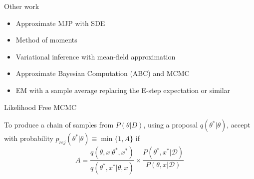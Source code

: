 \documentclass[12pt,a4paper,t,xcolor=dvipsnames,slidestop,compress,mathserif]{beamer}
\newcommand{\red}[1]{{\color{red}#1}}
\begin{document}
\begin{frame}{Other work}
\begin{itemize} 
\item Approximate MJP with SDE \cite{golightly2005bayesian,bayes_stoch_mod,fearnhead2014inference}

\item Method of moments \cite{milner2013moment,zechner2012moment}

\item Variational inference with mean-field approximation  \cite{opper2008variational} 

\item Approximate Bayesian Computation (ABC) and MCMC
\cite{owen2014ABC_LF-MCMCcomparison,owen2014scalable,hobolth2009simulation,zechner2014scalable}


\item EM with a sample average replacing the E-step expectation or similar \cite{gupta2014comparison,srivastava_rawlings2014stoch_opt,bayer2015stoch_em,horvath2008parameter,daigle2012accelerated}
\end{itemize}


\end{frame}
\begin{frame}{Likelihood Free MCMC}

To produce a chain of samples from $P(\theta|D)$, using a proposal $q(\theta^*|\theta)$, accept with probability $p_{rej}(\theta^*|\theta)\equiv\min \{1, A\}$ if $$A=\frac{q(\theta,x|\theta^*,x^*)}{q(\theta^*,x^*|\theta,x)} \times \frac{P(\theta^*,x^*|\mathcal{D})}{P(\theta,x|\mathcal{D})}
$$

\end{frame}
%
%
%
%
\end{document}
